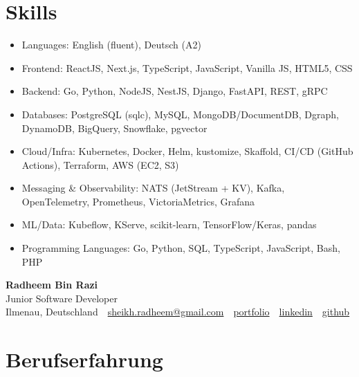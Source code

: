 \documentclass[10pt,a4paper]{resume}
\makeatletter
\newcommand{\Portfolio}{https://radheem.github.io/my-cv}
\newcommand{\PortfolioText}{portfolio}
\newcommand{\GitHub}{https://github.com/radheem}
\newcommand{\LinkedIn}{https://www.linkedin.com/in/radheem-razi}
\newcommand{\Email}{sheikh.radheem@gmail.com}
\makeatother
\begin{document}
\section{Skills}

\begin{itemize}[leftmargin=1.4em,nosep,topsep=2pt]
  \item Languages: English (fluent), Deutsch (A2)
  \item Frontend: ReactJS, Next.js, TypeScript, JavaScript, Vanilla JS, HTML5, CSS
  \item Backend: Go, Python, NodeJS, NestJS, Django, FastAPI, REST, gRPC
  \item Databases: PostgreSQL (sqlc), MySQL, MongoDB/DocumentDB, Dgraph, DynamoDB, BigQuery, Snowflake, pgvector
  \item Cloud/Infra: Kubernetes, Docker, Helm, kustomize, Skaffold, CI/CD (GitHub Actions), Terraform, AWS (EC2, S3)
  \item Messaging \& Observability: NATS (JetStream + KV), Kafka, OpenTelemetry, Prometheus, VictoriaMetrics, Grafana
  \item ML/Data: Kubeflow, KServe, scikit-learn, TensorFlow/Keras, pandas
  \item Programming Languages: Go, Python, SQL, TypeScript, JavaScript, Bash, PHP
\end{itemize}

\clearpage
{}

\begin{center}
  {\huge\bfseries Radheem Bin Razi}\\[3pt]
  {\large Junior Software Developer}\\[6pt]
  \small
  Ilmenau, Deutschland \,\textbar\,
  \href{mailto:\Email}{\Email} \,\textbar\,
  \href{\Portfolio}{\PortfolioText} \,\textbar\,
  \href{\LinkedIn}{linkedin} \,\textbar\,
  \href{\GitHub}{github}
\end{center}
\vspace{2pt}

\section{Berufserfahrung}
\end{document}
